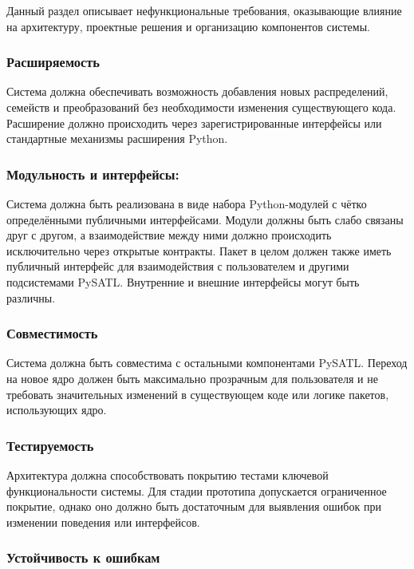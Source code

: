 Данный раздел описывает нефункциональные требования, оказывающие влияние на архитектуру, проектные решения и организацию компонентов системы.

\subsubsection{Расширяемость}

Система должна обеспечивать возможность добавления новых распределений, семейств и преобразований без необходимости изменения существующего кода. Расширение должно происходить через зарегистрированные интерфейсы или стандартные механизмы расширения Python.

\subsubsection{Модульность и интерфейсы:}

Система должна быть реализована в виде набора Python-модулей с чётко определёнными публичными интерфейсами. Модули должны быть слабо связаны друг с другом, а взаимодействие между ними должно происходить исключительно через открытые контракты. Пакет в целом должен также иметь публичный интерфейс для взаимодействия с пользователем и другими подсистемами PySATL. Внутренние и внешние интерфейсы могут быть различны.

\subsubsection{Совместимость}

Система должна быть совместима с остальными компонентами PySATL. Переход на новое ядро должен быть максимально прозрачным для пользователя и не требовать значительных изменений в существующем коде или логике пакетов, использующих ядро.

\subsubsection{Тестируемость}

Архитектура должна способствовать покрытию тестами ключевой функциональности системы. Для стадии прототипа допускается ограниченное покрытие, однако оно должно быть достаточным для выявления ошибок при изменении поведения или интерфейсов.

\subsubsection{Устойчивость к ошибкам}

